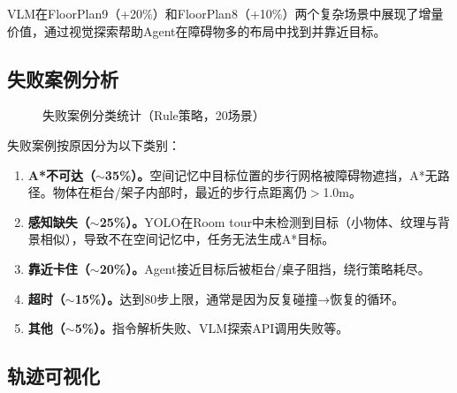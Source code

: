 \documentclass{SYSUReport}
\begin{document}
VLM在FloorPlan9（+20\%）和FloorPlan8（+10\%）两个复杂场景中展现了增量价值，通过视觉探索帮助Agent在障碍物多的布局中找到并靠近目标。

\subsection{失败案例分析}

\begin{figure}[!ht]
  \centering
  \caption{失败案例分类统计（Rule策略，20场景）}
  \label{fig:failure_pie}
\end{figure}

失败案例按原因分为以下类别：

\begin{enumerate}
  \item \textbf{A*不可达（$\sim$35\%）。}空间记忆中目标位置的步行网格被障碍物遮挡，A*无路径。物体在柜台/架子内部时，最近的步行点距离仍$>$1.0m。
  \item \textbf{感知缺失（$\sim$25\%）。}YOLO在Room tour中未检测到目标（小物体、纹理与背景相似），导致不在空间记忆中，任务无法生成A*目标。
  \item \textbf{靠近卡住（$\sim$20\%）。}Agent接近目标后被柜台/桌子阻挡，绕行策略耗尽。
  \item \textbf{超时（$\sim$15\%）。}达到80步上限，通常是因为反复碰撞→恢复的循环。
  \item \textbf{其他（$\sim$5\%）。}指令解析失败、VLM探索API调用失败等。
\end{enumerate}

\FloatBarrier
\subsection{轨迹可视化}
\end{document}
